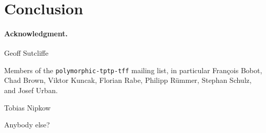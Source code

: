 \section{Conclusion}
\label{sec_concl}

\def\ackname{Acknowledgment}
\paragraph{\textbf{\upshape\ackname.}}
%

Geoff Sutcliffe

Members of the {\tt polymorphic-tptp-tff} mailing list, in particular
Fran\c{c}ois Bobot, Chad Brown, Viktor Kuncak, Florian Rabe, Philipp R\"ummer,
Stephan Schulz, and Josef Urban.

Tobias Nipkow

Anybody else?
